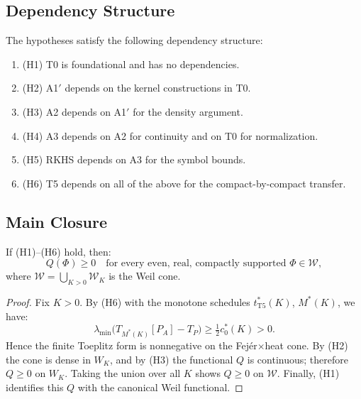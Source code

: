 \subsection{Dependency Structure}

The hypotheses satisfy the following dependency structure:

\begin{enumerate}
  \item (H1) T0 is foundational and has no dependencies.
  \item (H2) A1$'$ depends on the kernel constructions in T0.
  \item (H3) A2 depends on A1$'$ for the density argument.
  \item (H4) A3 depends on A2 for continuity and on T0 for normalization.
  \item (H5) RKHS depends on A3 for the symbol bounds.
  \item (H6) T5 depends on all of the above for the compact-by-compact transfer.
\end{enumerate}

\subsection{Main Closure}

\begin{theorem}\label{thm:Main-positivity-scope}
If \textup{(H1)}--\textup{(H6)} hold, then:
\begin{equation}
  Q(\Phi) \geq 0 \quad \text{for every even, real, compactly supported } \Phi \in \mathcal{W},
\end{equation}
where $\mathcal{W} = \bigcup_{K > 0} \mathcal{W}_K$ is the Weil cone.
\end{theorem}

\begin{proof}
Fix $K > 0$. By (H6) with the monotone schedules $t^*_{\mathrm{T5}}(K)$, $M^*(K)$, we have:
\begin{equation}
  \lambda_{\min}\big(T_{M^*(K)}[P_A] - T_P\big) \geq \tfrac{1}{2} c_0^*(K) > 0.
\end{equation}
Hence the finite Toeplitz form is nonnegative on the Fej\'er$\times$heat cone. By (H2) the cone is dense in $W_K$, and by (H3) the functional $Q$ is continuous; therefore $Q \geq 0$ on $W_K$. Taking the union over all $K$ shows $Q \geq 0$ on $\mathcal{W}$. Finally, (H1) identifies this $Q$ with the canonical Weil functional.
\end{proof}

